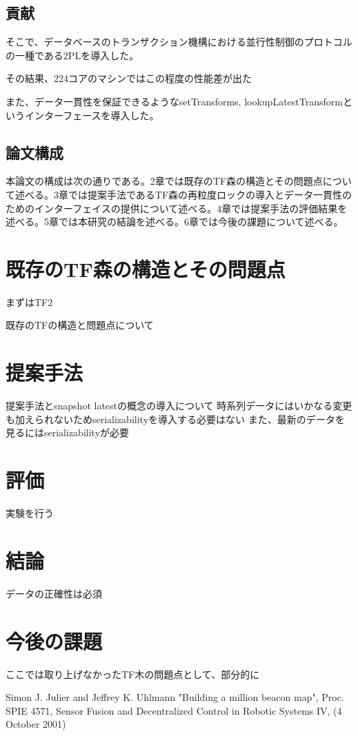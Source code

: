 \documentclass{article}
\begin{document}
\begin{multicols}{2}
\subsection{貢献}
そこで、データベースのトランザクション機構における並行性制御のプロトコルの一種である2PLを導入した。

その結果、224コアのマシンではこの程度の性能差が出た

また、データ一貫性を保証できるようなsetTransforms, lookupLatestTransformというインターフェースを導入した。

\subsection{論文構成}
本論文の構成は次の通りである。2章では既存のTF森の構造とその問題点について述べる。3章では提案手法であるTF森の再粒度ロックの導入とデータ一貫性のためのインターフェイスの提供について述べる。4章では提案手法の評価結果を述べる。5章では本研究の結論を述べる。6章では今後の課題について述べる。


\section{既存のTF森の構造とその問題点}

まずはTF2

既存のTFの構造と問題点について

\section{提案手法}

提案手法とsnapshot latestの概念の導入について
時系列データにはいかなる変更も加えられないためserializabilityを導入する必要はない
また、最新のデータを見るにはserializabilityが必要

\section{評価}
実験を行う

\section{結論}

データの正確性は必須

\section{今後の課題}

ここでは取り上げなかったTF木の問題点として、部分的に

	
\begin{thebibliography}{99}

 Simon J. Julier and Jeffrey K. Uhlmann "Building a million beacon map", Proc. SPIE 4571, Sensor Fusion and Decentralized Control in Robotic Systems IV, (4 October 2001)


\end{thebibliography}
	
\end{multicols}	
\end{document}
